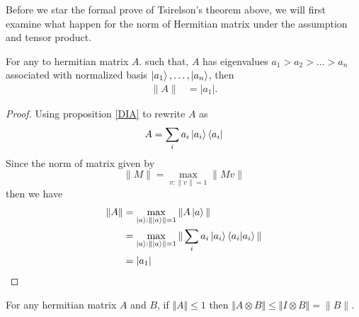 Before we star the formal prove of Tsirelson’s theorem above, we will first examine what happen for the norm of Hermitian matrix under the assumption and tensor product.
\begin{prop}\label{prop2}
For any to hermitian  matrix $A$. such that, $A$ has eigenvalues $a_1>a_2>\ldots> a_n$  associated with normalized basis $\ket{a_1},\ldots,\ket{a_n}$, then 
\begin{align*}
\|A\|&=|a_1|.
\end{align*}
\begin{proof}
Using  proposition \ref{DIA} to rewrite $A$ as 
\begin{align*}
A=\sum_i a_i \ket{a_i}\bra{a_i}
\end{align*}
Since the norm of matrix given by
\begin{equation}
\| M\|=\max_{v: \| v\|=1}\| M v\|
\end{equation}
then we have 
\begin{align*}
\| A \|&=\max_{\ket{a}: \| \ket{a}\|=1}\| A \ket{a}\|\\
&=\max_{\ket{a}: \| \ket{a}\|=1}\|\sum_i a_i\ket{a_i}\bra{a_i}\ket{a_i}\|\\
&=|a_1|
\end{align*}
\end{proof}
\end{prop}

\begin{lemma}
\label{lem:tensor-norm}
For any hermitian matrix $A$ and $B$, if $\Vert A\Vert \leqslant 1$ then $\Vert A\otimes B \Vert \leqslant \Vert I\otimes B \Vert=\|B\|$.
\end{lemma}


